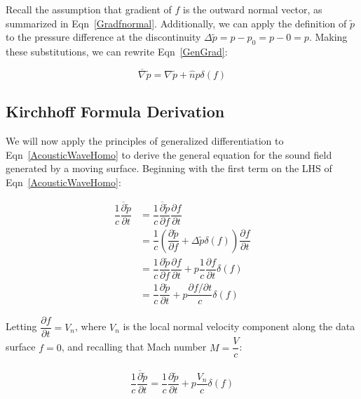\documentclass[]{aiaa-tc}%
\begin{document}
Recall the assumption that gradient of $f$ is the outward normal vector, as summarized in Eqn~\ref{Gradfnormal}.  Additionally, we can apply the definition of $\widetilde{p}$ to the pressure difference at the discontinuity $\Delta\widetilde{p} = p - p_0 = p - 0 = p$.  Making these substitutions, we can rewrite Eqn~\ref{GenGrad}:

\begin{equation} \label{GenGradAssume}
\overline{\nabla} \widetilde{p}
= \nabla\widetilde{p} + \hat{n} p \delta(f)
\end{equation}


\subsection{Kirchhoff Formula Derivation}

We will now apply the principles of generalized differentiation to Eqn~\ref{AcousticWaveHomo} to derive the general equation for the sound field generated by a moving surface.  Beginning with the first term on the LHS of Eqn~\ref{AcousticWaveHomo}:

\begin{align*}
\dfrac{1}{c}\dfrac{\overline{\partial}\widetilde{p}}{\partial t}
&= \dfrac{1}{c}\dfrac{\overline{\partial}\widetilde{p}}{\partial f}
    \dfrac{\partial f}{\partial t} \\
&= \dfrac{1}{c}\left( \dfrac{\partial\widetilde{p}}{\partial f}
    + \Delta \widetilde{p} \delta(f) \right)
    \dfrac{\partial f}{\partial t} \\
&= \dfrac{1}{c}\dfrac{\partial\widetilde{p}}{\partial f} \dfrac{\partial f}{\partial t}
    + p \dfrac{1}{c}\dfrac{\partial f}{\partial t} \delta(f) \\
&= \dfrac{1}{c}\dfrac{\partial\widetilde{p}}{\partial t}
    + p \dfrac{\partial f / \partial t}{c} \delta(f)
\end{align*}

\noindent Letting $\dfrac{\partial f}{\partial t} = V_n$, where $V_n$ is the local normal velocity component along the data surface $f=0$, and recalling that Mach number $M = \dfrac{V}{c}$:

\begin{align*}
\dfrac{1}{c}\dfrac{\overline{\partial}\widetilde{p}}{\partial t}
= \dfrac{1}{c}\dfrac{\partial\widetilde{p}}{\partial t}
    + p \dfrac{V_n}{c} \delta(f)
\end{align*}
\end{document}
